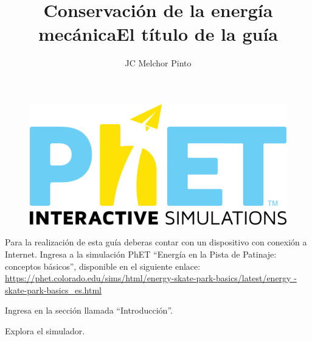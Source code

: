 \documentclass[12pt,addpoints,answers]{guia}
\title{Conservación de la energía mecánica}
\title{El título de la guía}
\author{JC Melchor Pinto}
\begin{document}
\pagestyle{headandfoot}

\INFO
\begin{opening}
    {
    \vspace{-0.7cm}
    \begin{figure}[H]
        \centering
        \includegraphics[width=.12\linewidth]{../images/phet}
    \end{figure}
    Para la realización de esta guía deberas contar con un dispositivo con
    conexión a Internet. Ingresa a la simulación PhET ``Energía en la Pista de
    Patinaje: conceptos básicos'', disponible en el siguiente enlace: \\
    {
    \small
    \url{https://phet.colorado.edu/sims/html/energy-skate-park-basics/latest/energy
        -skate-park-basics_es.html}
    }\\
    \begin{center}
        \begin{minipage}{0.8\textwidth}
            \begin{minipage}{.1\linewidth}
                \color{colorrds}\huge\faHome
            \end{minipage}%
            \begin{minipage}{.90\linewidth}
                \begin{tcolorbox}[width=\linewidth ,halign=left,colframe=rdsdark,arc=3mm, sharp corners=west]
                    Ingresa en la sección llamada ``Introducción''.\\
                \end{tcolorbox}
            \end{minipage}
        \end{minipage}

        \begin{minipage}{0.8\textwidth}
            \begin{minipage}{.1\linewidth}
                \color{colorrds}\huge\faSearch
            \end{minipage}%
            \begin{minipage}{.9\linewidth}
                \begin{tcolorbox}[width=\linewidth,halign=left,colframe=rdsdark,arc=3mm, sharp corners=west]
                    Explora el simulador.\\
                \end{tcolorbox}
            \end{minipage}
        \end{minipage}


\end{center}}
\end{opening}
\end{document}
